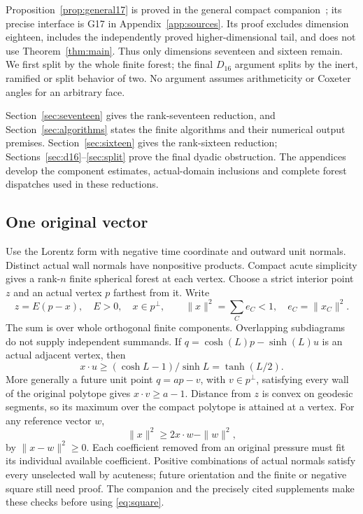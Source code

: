 \documentclass[11pt]{article}
\newcommand{\supp}[1]{\textsf{#1}}
\begin{document}
Proposition~\ref{prop:general17} is proved in the general compact
companion~\cite{ProjectGeneral}; its precise interface is \supp{G17}
in Appendix~\ref{app:sources}. Its proof excludes dimension eighteen,
includes the independently proved higher-dimensional tail, and does
not use Theorem~\ref{thm:main}. Thus only dimensions seventeen and
sixteen remain. We first split by the whole finite forest; the final
$D_{16}$ argument splits by the inert, ramified or split behavior of two.
No argument assumes arithmeticity or Coxeter angles for an arbitrary face.

Section~\ref{sec:seventeen} gives the rank-seventeen reduction, and
Section~\ref{sec:algorithms} states the finite algorithms and their
numerical output premises. Section~\ref{sec:sixteen} gives the
rank-sixteen reduction; Sections~\ref{sec:d16}--\ref{sec:split} prove
the final dyadic obstruction. The appendices develop the component
estimates, actual-domain inclusions and complete forest dispatches
used in these reductions.

\subsection{One original vector}
Use the Lorentz form with negative time coordinate and outward unit
normals. Distinct actual wall normals have nonpositive products.
Compact acute simplicity gives a rank-$n$ finite spherical forest at
each vertex. Choose a strict interior point $z$ and an actual vertex
$p$ farthest from it. Write
\[
 z=E(p-x),\quad E>0,\quad x\in p^\perp,\qquad
 \|x\|^2=\sum_C e_C<1,\quad e_C=\|x_C\|^2.
\]
The sum is over whole orthogonal finite components. Overlapping
subdiagrams do not supply independent summands.
If $q=\cosh(L)p-\sinh(L)u$ is an actual adjacent vertex, then
\begin{equation}\label{eq:edge}
 x\cdot u\ge(\cosh L-1)/\sinh L=\tanh(L/2).
\end{equation}
More generally a future unit point $q=ap-v$, with $v\in p^\perp$,
satisfying every wall of the original polytope gives $x\cdot v\ge a-1$.
Distance from $z$ is convex on geodesic segments, so its maximum over
the compact polytope is attained at a vertex.
For any reference vector $w$,
\begin{equation}\label{eq:square}
 \|x\|^2\ge2x\cdot w-\|w\|^2,
\end{equation}
by $\|x-w\|^2\ge0$.
Each coefficient removed from an original pressure must fit its
individual available coefficient. Positive combinations of actual
normals satisfy every unselected wall by acuteness; future orientation
and the finite or negative square still need proof. The companion
and the precisely cited supplements make these checks before using
\eqref{eq:square}.
\end{document}
